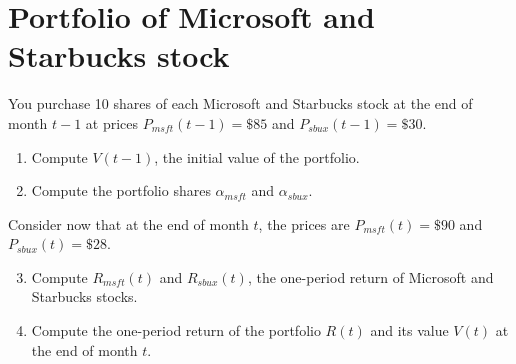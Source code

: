 \section{Portfolio of Microsoft and Starbucks stock}

You purchase 10 shares of each Microsoft and Starbucks stock at the end of month $t-1$ at prices
$P_{msft}(t-1) = \$85$ and $P_{sbux}(t-1) = \$30$. 

\begin{enumerate}
    \item Compute $V(t-1)$, the initial value of the portfolio.
    \item Compute the portfolio shares $\alpha_{msft}$ and $\alpha_{sbux}$.
\end{enumerate}

\noindent Consider now that at the end of month $t$, the prices are $P_{msft}(t) = \$90 $ and $P_{sbux}(t) = \$28$.

\begin{enumerate}
    \setcounter{enumi}{2}
    \item Compute $R_{msft}(t)$ and $R_{sbux}(t)$, the one-period return of Microsoft and Starbucks stocks. 
    \item Compute the one-period return of the portfolio $R(t)$ and its value $V(t)$ at the end of month $t$.
\end{enumerate}

